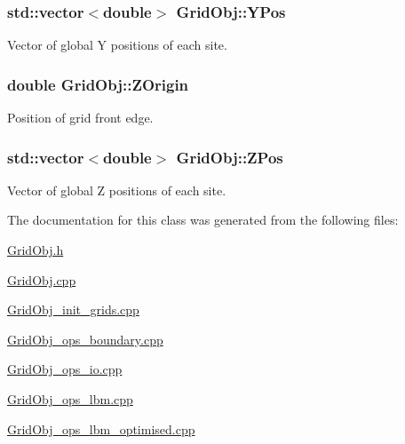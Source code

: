 \subsubsection[{\texorpdfstring{Y\+Pos}{YPos}}]{\setlength{\rightskip}{0pt plus 5cm}std\+::vector$<$double$>$ Grid\+Obj\+::\+Y\+Pos}\hypertarget{class_grid_obj_a2bd4e9b575377b8e76e5ebe7a3a31194}{}\label{class_grid_obj_a2bd4e9b575377b8e76e5ebe7a3a31194}


Vector of global Y positions of each site. 

\subsubsection[{\texorpdfstring{Z\+Origin}{ZOrigin}}]{\setlength{\rightskip}{0pt plus 5cm}double Grid\+Obj\+::\+Z\+Origin}\hypertarget{class_grid_obj_a69d43fd31ba7edd4fc9f02eb0c0fcefd}{}\label{class_grid_obj_a69d43fd31ba7edd4fc9f02eb0c0fcefd}


Position of grid front edge. 

\subsubsection[{\texorpdfstring{Z\+Pos}{ZPos}}]{\setlength{\rightskip}{0pt plus 5cm}std\+::vector$<$double$>$ Grid\+Obj\+::\+Z\+Pos}\hypertarget{class_grid_obj_af859d35bf0a03cee8965ce3e22e651c6}{}\label{class_grid_obj_af859d35bf0a03cee8965ce3e22e651c6}


Vector of global Z positions of each site. 



The documentation for this class was generated from the following files\+:\begin{DoxyCompactItemize}
\item 
\hyperlink{_grid_obj_8h}{Grid\+Obj.\+h}\item 
\hyperlink{_grid_obj_8cpp}{Grid\+Obj.\+cpp}\item 
\hyperlink{_grid_obj__init__grids_8cpp}{Grid\+Obj\+\_\+init\+\_\+grids.\+cpp}\item 
\hyperlink{_grid_obj__ops__boundary_8cpp}{Grid\+Obj\+\_\+ops\+\_\+boundary.\+cpp}\item 
\hyperlink{_grid_obj__ops__io_8cpp}{Grid\+Obj\+\_\+ops\+\_\+io.\+cpp}\item 
\hyperlink{_grid_obj__ops__lbm_8cpp}{Grid\+Obj\+\_\+ops\+\_\+lbm.\+cpp}\item 
\hyperlink{_grid_obj__ops__lbm__optimised_8cpp}{Grid\+Obj\+\_\+ops\+\_\+lbm\+\_\+optimised.\+cpp}\end{DoxyCompactItemize}
